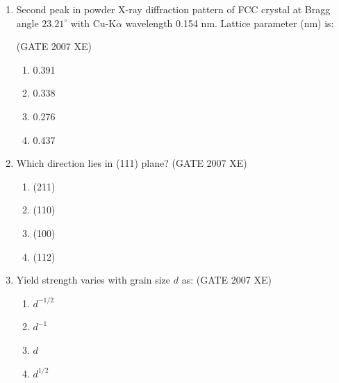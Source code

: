 \documentclass[journal,cmex10]{IEEEtran}
\theoremstyle{remark}
\numberwithin{equation}{enumi}
\numberwithin{figure}{enumi}
\begin{document}
\begin{enumerate}
\hfill{(GATE 2007 XE)}

\begin{multicols}{2}
\begin{enumerate}
    \item P-4, Q-1, R-3, S-2
    \item P-5, Q-1, R-3, S-2
    \item P-1, Q-4, R-2, S-3
    \item P-2, Q-5, R-3, S-4
\end{enumerate}
\end{multicols}


\item Second peak in powder X-ray diffraction pattern of FCC crystal at Bragg angle $23.21^\circ$ with Cu-K$\alpha$ wavelength 0.154 nm. Lattice parameter (nm) is:

\hfill{(GATE 2007 XE)}
\begin{multicols}{4}
\begin{enumerate}
    \item 0.391
    \item 0.338
    \item 0.276
    \item 0.437
\end{enumerate}
\end{multicols}

\newpage
\item  Which direction lies in (111) plane?  
\hfill{(GATE 2007 XE)}
\begin{multicols}{4}
\begin{enumerate}
    \item (211)
    \item (110)
    \item (100)
    \item (112)
\end{enumerate}
\end{multicols}

\item Yield strength varies with grain size $d$ as:  
\hfill{(GATE 2007 XE)}
\begin{multicols}{4}
\begin{enumerate}
    \item $d^{-1/2}$
    \item $d^{-1}$
    \item $d$
    \item $d^{1/2}$
\end{enumerate}
\end{multicols}


\end{enumerate}
\end{document}
